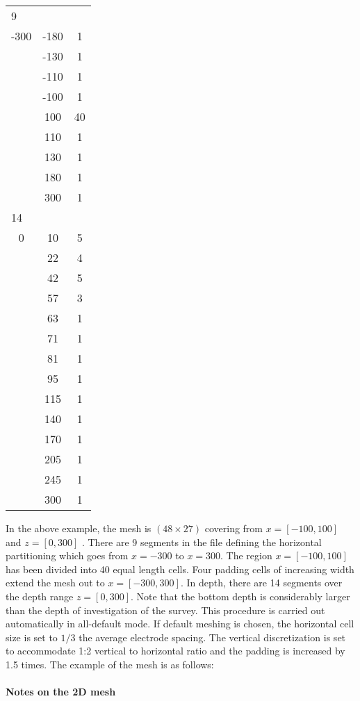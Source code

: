 \begin{fileExample}
\begin{tabular}{|ccc|}
\hline
\multicolumn{3}{|l|}{9} \\
-300 & -180 & 1 \\
 & -130 & 1 \\
 & -110 & 1 \\
 & -100 & 1 \\
 &  100 & 40 \\
 &  110 & 1 \\
 &  130 & 1 \\
 &  180 & 1 \\
 &  300 & 1 \\
\multicolumn{3}{|l|}{14} \\
0 & 10 & 5	\\
& 22 & 4	\\
& 42 & 5	\\
& 57 & 3	\\
& 63 & 1	\\
& 71 & 1	\\
& 81 & 1	\\
& 95 & 1	\\
& 115 & 1	\\
& 140 & 1	\\
& 170 & 1	\\
& 205 & 1	\\
& 245 & 1	\\
& 300 & 1	\\
\hline
\end{tabular}
\end{fileExample}

In the above example, the mesh is $(48 \times 27)$ covering from $x = [-100,100]$ and $z=[0,300]$ . There are 9 segments in the file defining the horizontal partitioning which goes from $x=-300$ to $x=300$. The region $x=[-100,100]$ has been divided into 40 equal length cells. Four padding cells of increasing width extend the mesh out to $x=[-300,300]$. In depth, there are 14 segments over the depth range $z=[0,300]$. Note that the bottom depth is considerably larger than the depth of investigation of the survey. This procedure is carried out automatically in all-default mode. If default meshing is chosen, the horizontal cell size is set to $1/3$ the average electrode spacing. The vertical discretization is set to accommodate 1:2 vertical to horizontal ratio and the padding is increased by 1.5 times. The example of the mesh is as follows:

\paragraph{Notes on the 2D mesh} 

